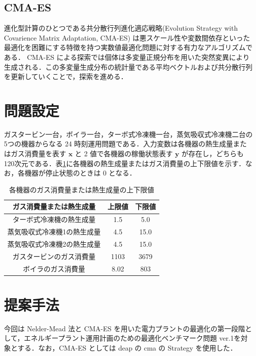 \documentclass[twocolumn]{jarticle}
\begin{document}
    \subsection{CMA-ES}
    進化型計算のひとつである共分散行列進化適応戦略(Evolution Strategy with Covarience Matrix Adaptation, CMA-ES)%
    は悪スケール性や変数間依存といった最適化を困難にする特徴を持つ実数値最適化問題に対する有力なアルゴリズムである．%
    CMA-ES による探索では個体は多変量正規分布を用いた突然変異により生成される．この多変量生成分布の統計量である平均ベクトルおよび共分散行列を更新していくことで，探索を進める．

\section{問題設定}
ガスタービン一台，ボイラ一台，ターボ式冷凍機一台，蒸気吸収式冷凍機二台の5つの機器からなる 24 時刻運用問題である．入力変数は各機器の熱生成量またはガス消費量を表す $\bm{x}$ と 2 値で各機器の稼働状態表す $\bm{y}$ が存在し，どちらも120次元である．表\ref{explain_variables}に各機器の熱生成量またはガス消費量の上下限値を示す．なお，各機器が停止状態のときは 0 となる．
\begin{table}[hbtp]
    \caption{各機器のガス消費量または熱生成量の上下限値}
    \label{explain_variables}
    \centering
    \begin{tabular}{|c|c|c|}
        \hline
        ガス消費量または熱生成量 & 上限値 & 下限値  \\
        \hline
        ターボ式冷凍機の熱生成量 & 1.5 & 5.0  \\
        蒸気吸収式冷凍機1の熱生成量 & 4.5 & 15.0  \\
        蒸気吸収式冷凍機2の熱生成量 & 4.5 & 15.0  \\
        ガスタービンのガス消費量 & 1103 & 3679 \\
        ボイラのガス消費量 & 8.02 & 803 \\
        \hline
    \end{tabular}
  \end{table}
  
\section{提案手法}
今回は Nelder-Mead 法と CMA-ES を用いた電力プラントの最適化の第一段階として，エネルギープラント運用計画のための最適化ベンチマーク問題 ver.1\cite{denki}を対象とする．なお，CMA-ES としては deap の cma の Strategy を使用した．%
\end{document}
